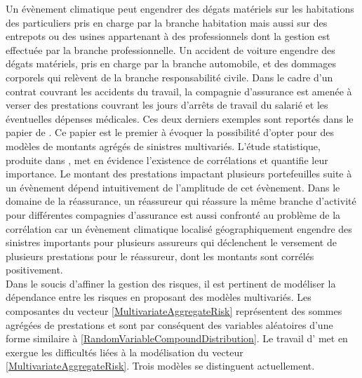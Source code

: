 Un évènement climatique peut engendrer des dégats matériels sur les habitations des particuliers pris en charge par la branche habitation mais aussi sur des entrepots ou des usines appartenant à des professionnels dont la gestion est effectuée par la branche professionnelle. Un accident de voiture engendre des dégats matériels, pris en charge par la branche automobile, et des dommages corporels qui relèvent de la branche responsabilité civile. Dans le cadre d\rq{}un contrat couvrant les accidents du travail, la compagnie d\rq{}assurance est amenée à verser des prestations couvrant les jours d\rq{}arrêts de travail du salarié et les éventuelles dépenses médicales. Ces deux derniers exemples sont reportés dans le papier de \citet{CuWi83}. Ce papier est le premier à évoquer la possibilité d\rq{}opter pour des modèles de montants agrégés de sinistres multivariés. L'étude statistique, produite dans \citet{CuWi83}, met en évidence l\rq{}existence de corrélations et quantifie leur importance. Le montant des prestations impactant plusieurs portefeuilles suite à un évènement dépend intuitivement de l\rq{}amplitude de cet évènement. Dans le domaine de la réassurance, un réassureur qui réassure la même branche d\rq{}activité pour différentes compagnies d\rq{}assurance est aussi confronté au problème de la corrélation car un évènement climatique localisé géographiquement engendre des sinistres importants pour plusieurs assureurs qui déclenchent le versement de plusieurs prestations pour le réassureur, dont les montants sont corrélés positivement.\\

Dans le soucis d\rq{}affiner la gestion des risques, il est pertinent de modéliser la dépendance entre les risques en proposant des modèles multivariés. Les composantes du vecteur \eqref{MultivariateAggregateRisk} représentent des sommes agrégées de prestations et sont par conséquent des variables aléatoires d\rq{}une forme similaire à \eqref{RandomVariableCompoundDistribution}. Le travail d\rq{}\citet{Am99} met en exergue les difficultés liées à la modélisation du vecteur \eqref{MultivariateAggregateRisk}. Trois modèles se distinguent actuellement.\\

